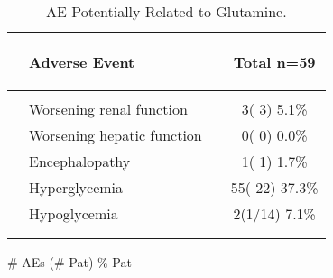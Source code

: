 \documentclass[dvips,10pt]{article}
\begin{document}
\begin{table}[t]
\caption
{ AE Potentially Related to Glutamine. }
\begin{center}
\begin{tabular}{ @{}l@{}
@{}l@{}@{}p{1.5em}@{}@{}c@{}
}
\hline

& \parbox{6em}{\begin{center}Adverse Event\end{center}} && \parbox{6em}{\begin{center}Total n=59\end{center}} \\

\hline

\\
& Worsening renal function && 3(  3)  5.1\% \\
& Worsening hepatic function && 0(  0)  0.0\% \\
& Encephalopathy && 1(  1)  1.7\% \\
& Hyperglycemia && 55( 22) 37.3\% \\
& Hypoglycemia && 2(1/14)  7.1\% \\
\\
\hline \\

\end{tabular}


\parbox{ 5in }{ \# AEs (\# Pat) \% Pat } \\
 \vspace{1em}\end{center}
 \end{table}
\clearpage
\end{document}
